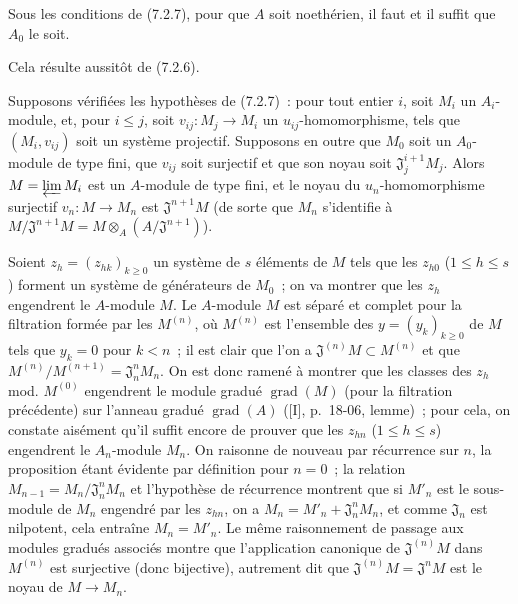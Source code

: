\begin{corollary}[7.2.8]
\label{0.7.2.8-fr}
Sous les conditions de (7.2.7), pour que $A$ soit noethérien, il faut et il
suffit que $A_0$ le soit.
\end{corollary}

Cela résulte aussitôt de (7.2.6).

\begin{proposition}[7.2.9]
\label{0.7.2.9-fr}
Supposons vérifiées les hypothèses de (7.2.7)~: pour tout entier $i$, soit
$M_i$ un $A_i$-module, et, pour $i\leq j$, soit
$v_{ij}:M_j\to M_i$ un $u_{ij}$-homomorphisme, tels que $(M_i,v_{ij})$ soit un
système projectif. Supposons en outre que $M_0$ soit un $A_0$-module de type
fini, que $v_{ij}$ soit surjectif et que son noyau soit
$\mathfrak J_j^{i+1}M_j$. Alors $M=\varprojlim M_i$ est un $A$-module de type
fini, et le noyau du $u_n$-homomorphisme surjectif $v_n:M\to M_n$ est
$\mathfrak J^{n+1}M$ (de sorte que $M_n$ s'identifie à
$M/\mathfrak J^{n+1}M=M\otimes_A(A/\mathfrak J^{n+1})$).
\end{proposition}

Soient $z_h=(z_{hk})_{k\geq0}$ un système de $s$ éléments de $M$ tels que les
$z_{h0}$ ($1\leq h\leq s$) forment un système de générateurs de $M_0$~; on va
montrer que les $z_h$ engendrent le $A$-module $M$. Le $A$-module $M$ est
séparé et complet pour la filtration formée par les $M^{(n)}$, où $M^{(n)}$
est l'ensemble des $y=(y_k)_{k\geq0}$ de $M$ tels que $y_k=0$ pour $k<n$~;
il est clair que l'on a $\mathfrak J^{(n)}M\subset M^{(n)}$ et que
$M^{(n)}/M^{(n+1)}=\mathfrak J_n^nM_n$. On est donc ramené à montrer que les
classes des $z_h$ mod. $M^{(0)}$ engendrent le module gradué
$\operatorname{grad}(M)$ (pour la filtration précédente) sur l'anneau gradué
$\operatorname{grad}(A)$ ([I], p.~18-06, lemme)~; pour cela, on constate
aisément qu'il suffit encore de prouver que les $z_{hn}$ ($1\leq h\leq s$)
engendrent le $A_n$-module $M_n$. On raisonne de nouveau par récurrence sur
$n$, la proposition étant évidente par définition pour $n=0$~; la relation
$M_{n-1}=M_n/\mathfrak J_n^nM_n$ et l'hypothèse de récurrence montrent que si
$M'_n$ est le sous-module de $M_n$ engendré par les $z_{hn}$, on a
$M_n=M'_n+\mathfrak J_n^nM_n$, et comme $\mathfrak J_n$ est nilpotent, cela
entraîne $M_n=M'_n$. Le même raisonnement de passage aux modules gradués
associés montre que l'application canonique de $\mathfrak J^{(n)}M$ dans
$M^{(n)}$ est surjective (donc bijective), autrement dit que
$\mathfrak J^{(n)}M=\mathfrak J^nM$ est le noyau de $M\to M_n$.

